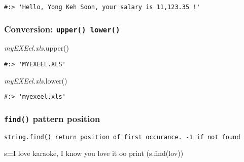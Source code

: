 \documentclass[
]{book}
\newenvironment{Shaded}{\begin{snugshade}}{\end{snugshade}}
\newcommand{\BuiltInTok}[1]{#1}
\newcommand{\CommentTok}[1]{\textcolor[rgb]{0.37,0.37,0.37}{\textit{#1}}}
\newcommand{\NormalTok}[1]{#1}
\newcommand{\OperatorTok}[1]{\textcolor[rgb]{0.43,0.43,0.43}{\textbf{#1}}}
\newcommand{\StringTok}[1]{\textcolor[rgb]{0.5,0.5,0.5}{#1}}
\begin{document}
\begin{verbatim}
#:> 'Hello, Yong Keh Soon, your salary is 11,123.35 !'
\end{verbatim}

\hypertarget{conversion-upper-lower}{%
\subsubsection{\texorpdfstring{Conversion: \texttt{upper()\ lower()}}{Conversion: upper() lower()}}\label{conversion-upper-lower}}

\begin{Shaded}
\begin{Highlighting}[]
\CommentTok{\textquotesingle{}myEXEel.xls\textquotesingle{}}\NormalTok{.upper()}
\end{Highlighting}
\end{Shaded}

\begin{verbatim}
#:> 'MYEXEEL.XLS'
\end{verbatim}

\begin{Shaded}
\begin{Highlighting}[]
\CommentTok{\textquotesingle{}myEXEel.xls\textquotesingle{}}\NormalTok{.lower()}
\end{Highlighting}
\end{Shaded}

\begin{verbatim}
#:> 'myexeel.xls'
\end{verbatim}

\hypertarget{find-pattern-position}{%
\subsubsection{\texorpdfstring{\texttt{find()} pattern position}{find() pattern position}}\label{find-pattern-position}}

\begin{verbatim}
string.find() return position of first occurance. -1 if not found
\end{verbatim}

\begin{Shaded}
\begin{Highlighting}[]
\NormalTok{s}\OperatorTok{=}\StringTok{\textquotesingle{}I love karaoke, I know you love it oo\textquotesingle{}}
\BuiltInTok{print}\NormalTok{ (s.find(}\StringTok{\textquotesingle{}lov\textquotesingle{}}\NormalTok{))}
\end{Highlighting}
\end{Shaded}
\end{document}
